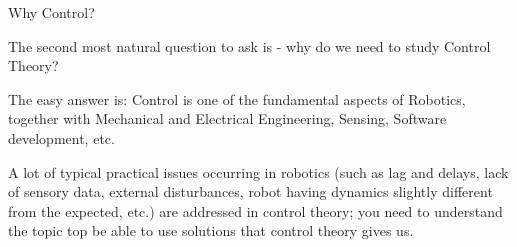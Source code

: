 \documentclass{beamer}
\begin{document}
\begin{frame}{Why Control?}
\begin{flushleft}

The second most natural question to ask is - why do we need to study Control Theory?

\bigskip

\begin{exampleblock}{The easy answer is:}
Control is one of the fundamental aspects of Robotics, together with Mechanical and Electrical Engineering, Sensing, Software development, etc.
\end{exampleblock}

A lot of typical practical issues occurring in robotics (such as lag and delays, lack of sensory data, external disturbances, robot having dynamics slightly different from the expected, etc.) are addressed in control theory; you need to understand the topic top be able to use solutions that control theory gives us.

\end{flushleft}
\end{frame}


%
%


%
%
%    
%    
%    
%
\end{document}
